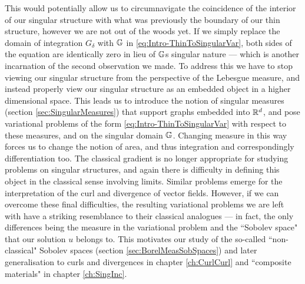 This would potentially allow us to circumnavigate the coincidence of the interior of our singular structure with what was previously the boundary of our thin structure, however we are not out of the woods yet.
If we simply replace the domain of integration $G_{\delta}$ with $\mathbb{G}$ in \eqref{eq:Intro-ThinToSingularVar}, both sides of the equation are identically zero in lieu of $\mathbb{G}$s singular nature --- which is another incarnation of the second observation we made.
To address this we have to stop viewing our singular structure from the perspective of the Lebesgue measure, and instead properly view our singular structure as an embedded object in a higher dimensional space.
This leads us to introduce the notion of singular measures (section \ref{sec:SingularMeasures}) that support graphs embedded into $\mathbb{R}^d$, and pose variational problems of the form \eqref{eq:Intro-ThinToSingularVar} with respect to these measures, and on the singular domain $\mathbb{G}$.
Changing measure in this way forces us to change the notion of area, and thus integration and correspondingly differentiation too.
The classical gradient is no longer appropriate for studying problems on singular structures, and again there is difficulty in defining this object in the classical sense involving limits.
Similar problems emerge for the interpretation of the curl and divergence of vector fields.
However, if we can overcome these final difficulties, the resulting variational problems we are left with have a striking resemblance to their classical analogues --- in fact, the only differences being the measure in the variational problem and the ``Sobolev space" that our solution $u$ belongs to.
This motivates our study of the so-called ``non-classical" Sobolev spaces (section \ref{sec:BorelMeasSobSpaces}) and later generalisation to curls and divergences in chapter \ref{ch:CurlCurl} and ``composite materials" in chapter \ref{ch:SingInc}.

